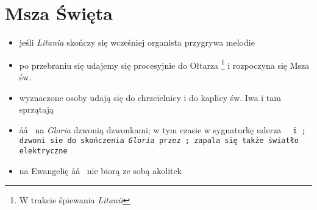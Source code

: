 \section{Msza Święta}

\begin{itemize}
	\item jeśli \textit{Litania} skończy się wcześniej organista przygrywa
	      melodie
	\item po przebraniu się udajemy się procesyjnie do Ołtarza \footnote{W
		      trakcie śpiewania \textit{Litanii}} i rozpoczyna się Msza św.
	\item wyznaczone osoby udają się do chrzcielnicy i do kaplicy św. Iwa i tam
	      sprzątają
	\item \aa\aa~ na \textit{Gloria} dzwonią dzwonkami; w tym czasie w
	      sygnaturkę uderza \tt~ i \zz; dzwoni sie do skończenia
	      \textit{Gloria} przez \ii; zapala się także światło elektryczne
	\item na Ewangelię \aa\aa~ nie biorą ze sobą akolitek
\end{itemize}